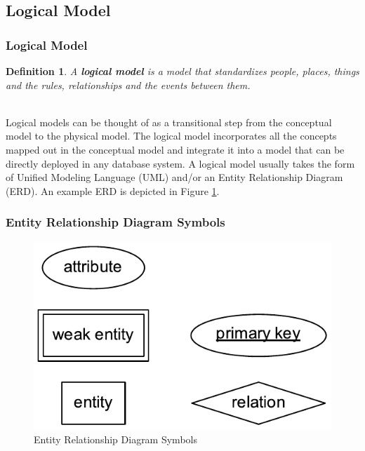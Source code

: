 \documentclass[aspectratio=169]{beamer}
\newtheorem{defn}{Definition}
\begin{document}
\subsection{Logical Model}
\begin{frame}
\frametitle{Logical Model}
\begin{defn}
A \textbf{logical model} is a model that standardizes people, places, things and the rules, relationships and the events between them.
\end{defn}
\pause
\mbox{}\\
Logical models can be thought of as a transitional step from the conceptual model to the physical model. The logical model incorporates all the concepts mapped out in the conceptual model and integrate it into a model that can be directly deployed in any database system. A logical model usually takes the form of Unified Modeling Language (UML) and/or an Entity Relationship Diagram (ERD). An example ERD is depicted in Figure \ref{fig:erd}.
\end{frame}

\begin{frame}
\frametitle{Entity Relationship Diagram Symbols}
\begin{figure}
\includegraphics{../artifacts/blank-erd.pdf}
\caption{Entity Relationship Diagram Symbols}
\label{fig:erd}
\end{figure}
\end{frame}
\end{document}
